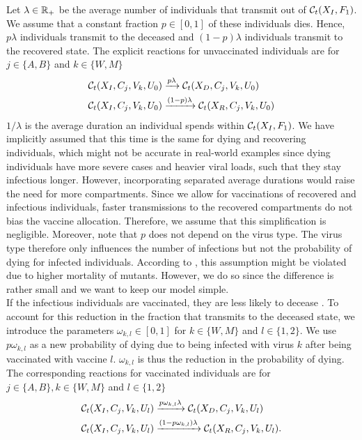 Let $\lambda \in \mathbb{R}_+$ be the average number of individuals that transmit out of $\mathcal{C}_t(X_I, F_1)$. We assume that a constant fraction $p \in [0,1]$ of these individuals dies. Hence, $p\lambda$ individuals transmit to the deceased and $(1-p)\lambda$ individuals transmit to the recovered state. 
The explicit reactions for unvaccinated individuals are for $j \in \{A, B\}$ and $k \in \{W, M\}$
\begin{align}
    \mathcal{C}_t(X_I, C_j, V_k, U_0) &\xrightarrow{p \lambda} \mathcal{C}_t(X_D,C_j, V_k, U_0)  \\
    \mathcal{C}_t(X_I, C_j, V_k, U_0) &\xrightarrow{(1-p) \lambda} \mathcal{C}_t(X_R,C_j, V_k, U_0) \notag
\end{align}
$1/\lambda$ is the average duration an individual spends within $\mathcal{C}_t(X_I, F_1)$. We have implicitly assumed that this time is the same for dying and recovering individuals, which might not be accurate in real-world examples since dying individuals have more severe cases and heavier viral loads, such that they stay infectious longer. However, incorporating separated average durations would raise the need for more compartments. Since we allow for vaccinations of recovered and infectious individuals, faster transmissions to the recovered compartments do not bias the vaccine allocation. Therefore, we assume that this simplification is negligible. Moreover, note that $p$ does not depend on the virus type. The virus type therefore only influences the number of infections but not the probability of dying for infected individuals. According to \cite{Davies.2021}, this assumption might be violated due to higher mortality of mutants. However, we do so since the difference is rather small and we want to keep our model simple. \\


If the infectious individuals are vaccinated, they are less likely to decease \citep{Tenforde.2021, Voysey.2021}. To account for this reduction in the fraction that transmits to the deceased state, we introduce the parameters $\omega_{k,l} \in [0,1]$ for $k \in \{W, M\}$ and $l \in \{1,2\}$. We use $p \omega_{k,l}$ as a new probability of dying due to being infected with virus $k$ after being vaccinated with vaccine $l$. $\omega_{k,l}$ is thus the reduction in the probability of dying. The corresponding reactions for vaccinated individuals are for $j \in \{A, B\}, k \in \{W, M\}$ and $l \in \{1,2\}$
\begin{align}
    \mathcal{C}_t(X_I, C_j, V_k, U_l) &\xrightarrow{p \omega_{k,l} \lambda} \mathcal{C}_t(X_D,C_j, V_k, U_l) \\
    \mathcal{C}_t(X_I, C_j, V_k, U_l) &\xrightarrow{(1-p \omega_{k,l}) \lambda} \mathcal{C}_t(X_R,C_j, V_k, U_l) \notag.
\end{align}

